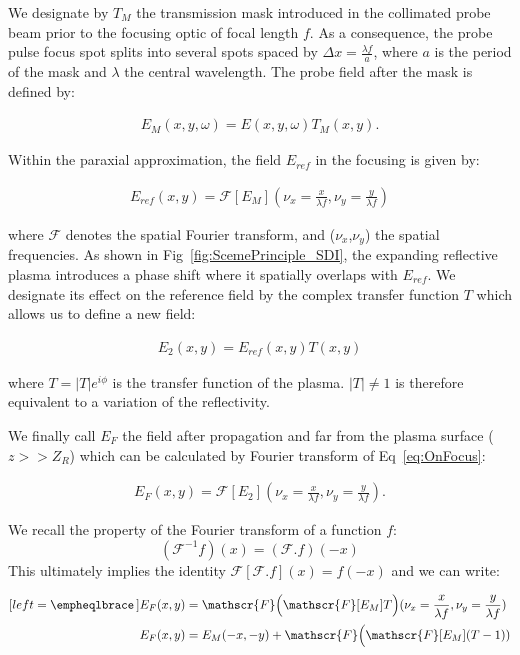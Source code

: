 \noindent We designate by $T_M$ the transmission mask introduced in the collimated probe beam prior to the focusing optic of focal length $f$. As a consequence, the probe pulse focus spot splits into several spots spaced by $\Delta x =
\frac{\lambda f}{a}$, where $a$ is the period of the mask and $\lambda$ the central wavelength. The probe field after the mask is defined by:

\begin{align} E_M(x,y,\omega) = E(x,y,\omega)T_M(x,y).\end{align}

\noindent Within the paraxial approximation, the field $E_{ref}$ in the focusing is given by:

\begin{align} E_{ref}(x,y) = \mathscr{F}[E_M](\nu_x = \frac{x}{\lambda f},\nu_y = \frac{y}{\lambda f})\end{align}

\noindent where $\mathscr{F}$ denotes the spatial Fourier transform, and ($\nu_x$,$\nu_y$) the spatial frequencies.
As shown in Fig~\ref{fig:ScemePrinciple_SDI}, the expanding reflective plasma introduces a phase shift where it spatially overlaps with $E_{ref}$. We designate its effect on the reference field 
by the complex transfer function $T$ which allows us to define a new field:

\begin{align} \label{eq:OnFocus} E_2(x,y) = E_{ref}(x,y)T(x,y)
\end{align}

\noindent where $T= |T|e^{i\phi}$ is the transfer function of the plasma. $|T|\ne 1$ is therefore equivalent to a variation of the reflectivity.

\noindent We finally call $E_F$ the field after propagation and far from the plasma surface ($z>>Z_R$) which can be calculated by Fourier transform of Eq~\ref{eq:OnFocus}:

\begin{align} \label{eq:FarField} E_{F}(x,y) = \mathscr{F}[E_2](\nu_x = \frac{x}{\lambda f},\nu_y = \frac{y}{\lambda f}).\end{align}

\noindent We recall the property of the Fourier transform of a function $f$:
$$(\mathscr{F}^{-1} f) (x) = (\mathscr{F}.f)(-x)
$$
\noindent This ultimately implies the identity $\mathscr{F}[\mathscr{F}.f](x) = f(-x)$ and we can write:

\begin{subequations}
\label{equation-motion-pond2}
\begin{align}[left = \empheqlbrace\,]
&\label{eq:FarField2} E_{F}(x,y) = \mathscr{F}\Bigl(\mathscr{F}[E_M] T \Bigr)(\nu_x = \frac{x}{\lambda f},\nu_y = \frac{y}{\lambda f})\\
&\label{eq:FarField3}  E_{F}(x,y) = E_M(-x,-y) + \mathscr{F}\Bigl(\mathscr{F}[E_M](T-1)) 
\end{align}
\end{subequations}



